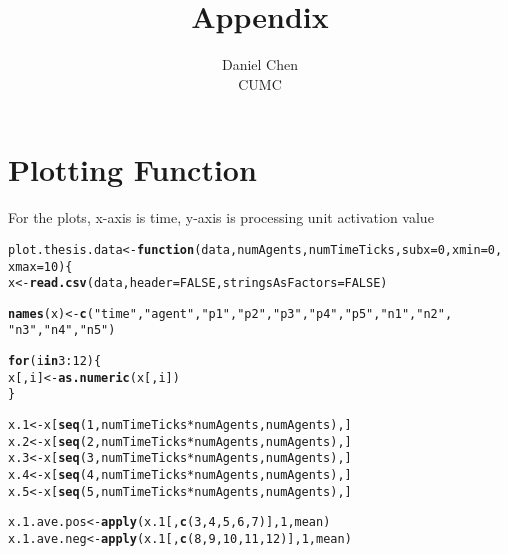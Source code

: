 \documentclass{article}\usepackage[]{graphicx}\usepackage[]{color}
\title{Appendix}
\author{Daniel Chen \\ CUMC}
\date{}
\makeatletter
\newcommand{\hlnum}[1]{\textcolor[rgb]{0.686,0.059,0.569}{#1}}%
\newcommand{\hlstr}[1]{\textcolor[rgb]{0.192,0.494,0.8}{#1}}%
\newcommand{\hlopt}[1]{\textcolor[rgb]{0,0,0}{#1}}%
\newcommand{\hlstd}[1]{\textcolor[rgb]{0.345,0.345,0.345}{#1}}%
\newcommand{\hlkwa}[1]{\textcolor[rgb]{0.161,0.373,0.58}{\textbf{#1}}}%
\newcommand{\hlkwb}[1]{\textcolor[rgb]{0.69,0.353,0.396}{#1}}%
\newcommand{\hlkwc}[1]{\textcolor[rgb]{0.333,0.667,0.333}{#1}}%
\newcommand{\hlkwd}[1]{\textcolor[rgb]{0.737,0.353,0.396}{\textbf{#1}}}%
\newenvironment{kframe}{%
 \def\at@end@of@kframe{}%
 \ifinner\ifhmode%
  \def\at@end@of@kframe{\end{minipage}}%
  \begin{minipage}{\columnwidth}%
 \fi\fi%
 \def\FrameCommand##1{\hskip\@totalleftmargin \hskip-\fboxsep
 \colorbox{shadecolor}{##1}\hskip-\fboxsep
     \hskip-\linewidth \hskip-\@totalleftmargin \hskip\columnwidth}%
 \MakeFramed {\advance\hsize-\width
   \@totalleftmargin\z@ \linewidth\hsize
   \@setminipage}}%
 {\par\unskip\endMakeFramed%
 \at@end@of@kframe}
\newenvironment{knitrout}{}{} %
\makeatother
\begin{document}
\maketitle
\tableofcontents

\section{Plotting Function}
\label{sec:plot-function}
For the plots, x-axis is time, y-axis is processing unit activation value

\begin{knitrout}
\color{fgcolor}\begin{kframe}
\begin{alltt}
\hlstd{plot.thesis.data} \hlkwb{<-} \hlkwa{function}\hlstd{(}\hlkwc{data}\hlstd{,} \hlkwc{numAgents}\hlstd{,} \hlkwc{numTimeTicks}\hlstd{,} \hlkwc{subx} \hlstd{=} \hlnum{0}\hlstd{,} \hlkwc{xmin} \hlstd{=} \hlnum{0}\hlstd{,}
    \hlkwc{xmax} \hlstd{=} \hlnum{10}\hlstd{) \{}
    \hlstd{x} \hlkwb{<-} \hlkwd{read.csv}\hlstd{(data,} \hlkwc{header} \hlstd{=} \hlnum{FALSE}\hlstd{,} \hlkwc{stringsAsFactors} \hlstd{=} \hlnum{FALSE}\hlstd{)}

    \hlkwd{names}\hlstd{(x)} \hlkwb{<-} \hlkwd{c}\hlstd{(}\hlstr{"time"}\hlstd{,} \hlstr{"agent"}\hlstd{,} \hlstr{"p1"}\hlstd{,} \hlstr{"p2"}\hlstd{,} \hlstr{"p3"}\hlstd{,} \hlstr{"p4"}\hlstd{,} \hlstr{"p5"}\hlstd{,} \hlstr{"n1"}\hlstd{,} \hlstr{"n2"}\hlstd{,}
        \hlstr{"n3"}\hlstd{,} \hlstr{"n4"}\hlstd{,} \hlstr{"n5"}\hlstd{)}



    \hlkwa{for} \hlstd{(i} \hlkwa{in} \hlnum{3}\hlopt{:}\hlnum{12}\hlstd{) \{}
        \hlstd{x[, i]} \hlkwb{<-} \hlkwd{as.numeric}\hlstd{(x[, i])}
    \hlstd{\}}

    \hlstd{x.1} \hlkwb{<-} \hlstd{x[}\hlkwd{seq}\hlstd{(}\hlnum{1}\hlstd{, numTimeTicks} \hlopt{*} \hlstd{numAgents, numAgents), ]}
    \hlstd{x.2} \hlkwb{<-} \hlstd{x[}\hlkwd{seq}\hlstd{(}\hlnum{2}\hlstd{, numTimeTicks} \hlopt{*} \hlstd{numAgents, numAgents), ]}
    \hlstd{x.3} \hlkwb{<-} \hlstd{x[}\hlkwd{seq}\hlstd{(}\hlnum{3}\hlstd{, numTimeTicks} \hlopt{*} \hlstd{numAgents, numAgents), ]}
    \hlstd{x.4} \hlkwb{<-} \hlstd{x[}\hlkwd{seq}\hlstd{(}\hlnum{4}\hlstd{, numTimeTicks} \hlopt{*} \hlstd{numAgents, numAgents), ]}
    \hlstd{x.5} \hlkwb{<-} \hlstd{x[}\hlkwd{seq}\hlstd{(}\hlnum{5}\hlstd{, numTimeTicks} \hlopt{*} \hlstd{numAgents, numAgents), ]}

    \hlstd{x.1.ave.pos} \hlkwb{<-} \hlkwd{apply}\hlstd{(x.1[,} \hlkwd{c}\hlstd{(}\hlnum{3}\hlstd{,} \hlnum{4}\hlstd{,} \hlnum{5}\hlstd{,} \hlnum{6}\hlstd{,} \hlnum{7}\hlstd{)],} \hlnum{1}\hlstd{, mean)}
    \hlstd{x.1.ave.neg} \hlkwb{<-} \hlkwd{apply}\hlstd{(x.1[,} \hlkwd{c}\hlstd{(}\hlnum{8}\hlstd{,} \hlnum{9}\hlstd{,} \hlnum{10}\hlstd{,} \hlnum{11}\hlstd{,} \hlnum{12}\hlstd{)],} \hlnum{1}\hlstd{, mean)}


\end{alltt}
\end{kframe}
\end{knitrout}
\end{document}
